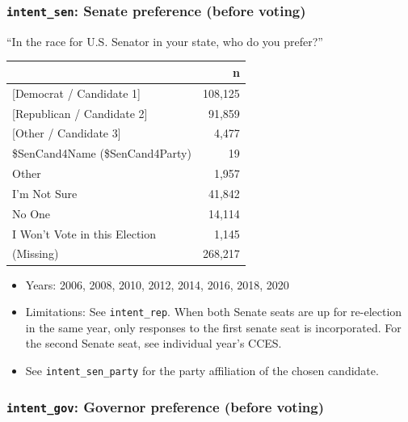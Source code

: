 \documentclass[10pt,article,oneside]{memoir}
\theoremstyle{definition}
\begin{document}
\hypertarget{intent_sen-senate-preference-before-voting}{%
\subsubsection{\texorpdfstring{\texttt{intent\_sen}: Senate preference
(before
voting)}{intent\_sen: Senate preference (before voting)}}\label{intent_sen-senate-preference-before-voting}}

``In the race for U.S. Senator in your state, who do you prefer?''

\begin{table}[H]
\centering
\begin{tabular}{lr}
\toprule
 & n\\
\midrule
{[Democrat / Candidate 1]} & 108,125\\
{[Republican / Candidate 2]} & 91,859\\
{[Other / Candidate 3]} & 4,477\\
\$SenCand4Name (\$SenCand4Party) & 19\\
Other & 1,957\\
I'm Not Sure & 41,842\\
No One & 14,114\\
I Won't Vote in this Election & 1,145\\
(Missing) & 268,217\\
\bottomrule
\end{tabular}
\end{table}

\begin{itemize}
\tightlist
\item
  Years: 2006, 2008, 2010, 2012, 2014, 2016, 2018, 2020
\item
  Limitations: See \texttt{intent\_rep}. When both Senate seats are up
  for re-election in the same year, only responses to the first senate
  seat is incorporated. For the second Senate seat, see individual
  year's CCES.
\item
  See \texttt{intent\_sen\_party} for the party affiliation of the
  chosen candidate.
\end{itemize}

\hypertarget{intent_gov-governor-preference-before-voting}{%
\subsubsection{\texorpdfstring{\texttt{intent\_gov}: Governor preference
(before
voting)}{intent\_gov: Governor preference (before voting)}}\label{intent_gov-governor-preference-before-voting}}
\end{document}
